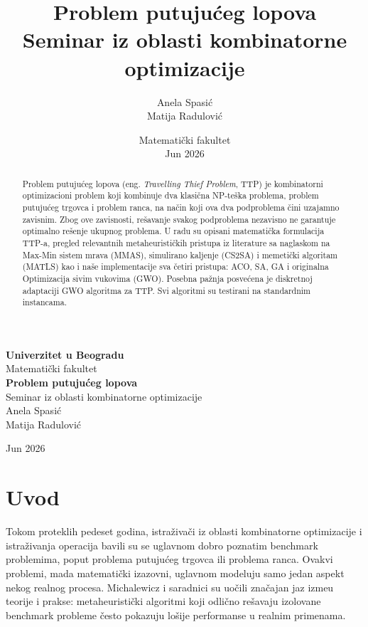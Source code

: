 \documentclass[12pt,a4paper]{article}
\title{\textbf{Problem putuju\'{c}eg lopova}\\[0.8em]
\large Seminar iz oblasti kombinatorne optimizacije}
\author{
\begin{center}
An\dj{}ela Spasi\'{c} \\
Matija Radulovi\'{c}
\end{center}
}
\date{
\vfill
\large Matemati\v{c}ki fakultet\\
Jun 2026
}
\begin{document}
\begin{titlepage}
\centering

\vspace*{2cm}

{\LARGE \textbf{Univerzitet u Beogradu}}\\[0.5em]
{\Large Matemati\v{c}ki fakultet}\\[3cm]

{\Huge \textbf{Problem putuju\'{c}eg lopova}}\\[0.8em]
{\Large Seminar iz oblasti kombinatorne optimizacije}\\[3cm]

{\Large
An\dj{}ela Spasi\'{c} \\
Matija Radulovi\'{c}
}\\[4cm]

\vfill

{\large Jun 2026}

\end{titlepage}

\thispagestyle{empty}

\begin{abstract}
Problem putuju\'{c}eg lopova (eng. \textit{Travelling Thief Problem}, TTP) je kombinatorni optimizacioni problem koji kombinuje dva klasi\v{c}na NP-te\v{s}ka problema, problem putuju\'{c}eg trgovca i problem ranca, na na\v{c}in koji ova dva podproblema \v{c}ini uzajamno zavisnim. Zbog ove zavisnosti, re\v{s}avanje svakog podproblema nezavisno ne garantuje optimalno re\v{s}enje ukupnog problema. U radu su opisani matematička formulacija TTP-a, pregled relevantnih metaheuristi\v{c}kih pristupa iz literature sa naglaskom na Max-Min sistem mrava (MMAS), simulirano kaljenje (CS2SA) i memetički algoritam (MATLS) kao i naše implementacije sva \v{c}etiri pristupa: ACO, SA, GA i originalna Optimizacija sivim vukovima (GWO). Posebna pa\v{z}nja posve\'{c}ena je diskretnoj adaptaciji GWO algoritma za TTP. Svi algoritmi su testirani na standardnim instancama.
\end{abstract}

\newpage
\tableofcontents
\newpage

\section{Uvod}

Tokom proteklih pedeset godina, istra\v{z}iva\v{c}i iz oblasti kombinatorne optimizacije i istra\v{z}ivanja operacija bavili su se uglavnom dobro poznatim benchmark problemima, poput problema putuju\'{c}eg trgovca ili problema ranca. Ovakvi problemi, mada matemati\v{c}ki izazovni, uglavnom modeluju samo jedan aspekt nekog realnog procesa. Michalewicz i saradnici su uo\v{c}ili zna\v{c}ajan jaz izme\dj{}u teorije i prakse: metaheuristi\v{c}ki algoritmi koji odli\v{c}no re\v{s}avaju izolovane benchmark probleme \v{c}esto pokazuju lo\v{s}ije performanse u realnim primenama.
\end{document}

